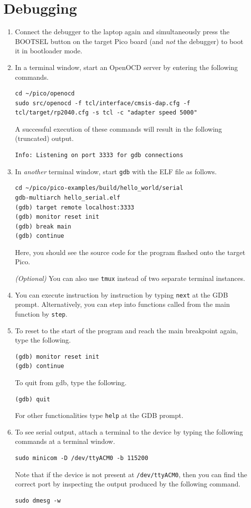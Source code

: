 \section{Debugging}
\begin{enumerate}
    \item Connect the debugger to the laptop again and simultaneously press the
    BOOTSEL button on the target Pico board (and \emph{not} the debugger) to
    boot it in bootloader mode.
    \item In a terminal window, start an OpenOCD server by entering the
    following commands.
    \begin{lstlisting}
cd ~/pico/openocd
sudo src/openocd -f tcl/interface/cmsis-dap.cfg -f tcl/target/rp2040.cfg -s tcl -c "adapter speed 5000"
    \end{lstlisting}
    A successful execution of these commands will result in the following
    (truncated) output.
    \begin{lstlisting}
Info: Listening on port 3333 for gdb connections
    \end{lstlisting}
    \item In \emph{another} terminal window, start \texttt{gdb} with the ELF
    file as follows.
    \begin{lstlisting}
cd ~/pico/pico-examples/build/hello_world/serial
gdb-multiarch hello_serial.elf
(gdb) target remote localhost:3333
(gdb) monitor reset init
(gdb) break main
(gdb) continue
    \end{lstlisting}
    Here, you should see the source code for the program flashed onto the target
    Pico.

    \emph{(Optional)} You can also use \texttt{tmux} instead of two separate
    terminal instances.
    \item You can execute instruction by instruction by typing \texttt{next} at
    the GDB prompt. Alternatively, you can step into functions called from the
    main function by \texttt{step}. 
    \item To reset to the start of the program and reach the main breakpoint
    again, type the following.
    \begin{lstlisting}
(gdb) monitor reset init
(gdb) continue
    \end{lstlisting}
    To quit from gdb, type the following.
    \begin{lstlisting}
(gdb) quit
    \end{lstlisting}
    For other functionalities type \texttt{help} at the GDB
    prompt.
    \item To see serial output, attach a terminal to the device by typing the
    following commands at a terminal window.
    \begin{lstlisting}
sudo minicom -D /dev/ttyACM0 -b 115200
    \end{lstlisting}
    Note that if the device is not present at \texttt{/dev/ttyACM0}, then you
    can find the correct port by inspecting the output produced by the
    following command.
    \begin{lstlisting}
sudo dmesg -w
    \end{lstlisting}
\end{enumerate}